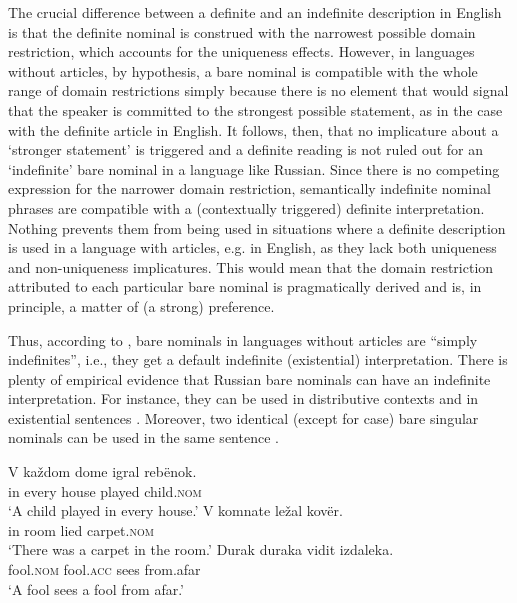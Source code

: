 \documentclass[output=paper,
colorlinks,
citecolor=brown,
newtxmath
]{langscibook}
\begin{document}
The crucial difference between a definite and an indefinite description in English is that the definite nominal is construed with the narrowest possible domain restriction, which accounts for the uniqueness effects. However, in languages without articles, by hypothesis, a bare nominal is compatible with the whole range of domain restrictions simply because there is no element that would signal that the speaker is committed to the strongest possible statement, as in the case with the definite article in English. It follows, then, that no implicature about a `stronger statement' is triggered and a definite reading is not ruled out for an `indefinite' bare nominal in a language like Russian. Since there is no competing expression for the narrower domain restriction, semantically indefinite nominal phrases are compatible with a (contextually triggered) definite interpretation. Nothing prevents them from being used in situations where a definite description is used in a language with articles, e.g. in English, as they lack both uniqueness and non-uniqueness implicatures. This would mean that the domain restriction attributed to each particular bare nominal is pragmatically derived and is, in principle, a matter of (a strong) preference.

Thus, according to \citet[1006]{Heim2011}, bare nominals in languages without articles are ``simply indefinites'', i.e., they get a default indefinite (existential) interpretation. There is plenty of empirical evidence that
Russian bare nominals can have an indefinite interpretation. For instance, they can be used in distributive contexts  and in existential sentences . Moreover, two identical (except for case) bare singular nominals can be used in the same sentence .

\ea \label{ex:28}
\gll	V	každom	dome		igral		rebënok. \\
	   	in	every		house	played	child.\textsc{nom}\\
	\glt `A child played in every house.'
\z
\ea \label{ex:29}
\gll	V	komnate	ležal	kovër. \\
in 	room 		lied 	carpet.\textsc{nom}\\
\glt`There was a carpet in the room.'
\z
\ea \label{ex:30}
\gll	Durak		duraka	vidit	izdaleka. \\
fool.\textsc{nom} 	fool.\textsc{acc} 	sees 	from.afar\\
\glt `A fool sees a fool from afar.'
\z
\end{document}
